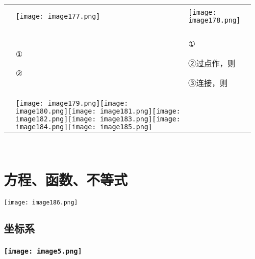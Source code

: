 \begin{longtable}[]{@{}lll@{}}
\toprule
\endhead
& &\tabularnewline
&
\texttt{[image: image177.png]}
&
\texttt{[image: image178.png]}\tabularnewline
& &\tabularnewline
\begin{minipage}[t]{0.30\columnwidth}\raggedright
\strut
\end{minipage} & \begin{minipage}[t]{0.30\columnwidth}\raggedright
①

②\strut
\end{minipage} & \begin{minipage}[t]{0.30\columnwidth}\raggedright
①

②过点作，则

③连接，则\strut
\end{minipage}\tabularnewline
&
\texttt{[image: image179.png]}\texttt{[image: image180.png]}\texttt{[image: image181.png]}\texttt{[image: image182.png]}\texttt{[image: image183.png]}\texttt{[image: image184.png]}\texttt{[image: image185.png]}
&\tabularnewline
\bottomrule
\end{longtable}

~

\hypertarget{ux65b9ux7a0bux51fdux6570ux4e0dux7b49ux5f0f}{%
\section{\texorpdfstring{
方程、函数、不等式}{ 方程、函数、不等式}}\label{ux65b9ux7a0bux51fdux6570ux4e0dux7b49ux5f0f}}

\texttt{[image: image186.png]}

\hypertarget{ux5750ux6807ux7cfb}{%
\subsection{\texorpdfstring{
坐标系}{ 坐标系}}\label{ux5750ux6807ux7cfb}}

\hypertarget{ux5b66ux79d1ux7f51www.zxxk.com--ux6559ux80b2ux8d44ux6e90ux95e8ux6237ux63d0ux4f9bux8bd5ux9898ux8bd5ux5377ux6559ux6848ux8bfeux4ef6ux6559ux5b66ux8bbaux6587ux7d20ux6750ux7b49ux5404ux7c7bux6559ux5b66ux8d44ux6e90ux5e93ux4e0bux8f7dux8fd8ux6709ux5927ux91cfux4e30ux5bccux7684ux6559ux5b66ux8d44ux8baf-30}{%
\subsubsection{\texorpdfstring{\protect\texttt{[image: image5.png]}}{学科网(www.zxxk.com)-\/-教育资源门户，提供试题试卷、教案、课件、教学论文、素材等各类教学资源库下载，还有大量丰富的教学资讯！}}\label{ux5b66ux79d1ux7f51www.zxxk.com--ux6559ux80b2ux8d44ux6e90ux95e8ux6237ux63d0ux4f9bux8bd5ux9898ux8bd5ux5377ux6559ux6848ux8bfeux4ef6ux6559ux5b66ux8bbaux6587ux7d20ux6750ux7b49ux5404ux7c7bux6559ux5b66ux8d44ux6e90ux5e93ux4e0bux8f7dux8fd8ux6709ux5927ux91cfux4e30ux5bccux7684ux6559ux5b66ux8d44ux8baf-30}}

